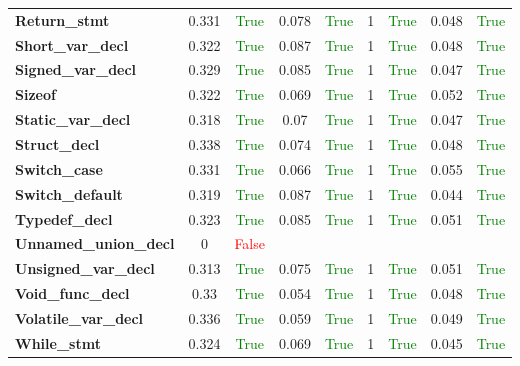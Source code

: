\documentclass{article}
\begin{document}
\begin{xltabular}{\textwidth}{lcccccccc}
\textbf{{\fontsize{10}{12}\selectfont Return\_stmt}}& 0.331&\textcolor{green}{True}& 0.078&\textcolor{green}{True}& 1&\textcolor{green}{True}& 0.048&\textcolor{green}{True} \\[0.5ex]
\textbf{{\fontsize{10}{12}\selectfont Short\_var\_decl}}& 0.322&\textcolor{green}{True}& 0.087&\textcolor{green}{True}& 1&\textcolor{green}{True}& 0.048&\textcolor{green}{True} \\[0.5ex]
\textbf{{\fontsize{10}{12}\selectfont Signed\_var\_decl}}& 0.329&\textcolor{green}{True}& 0.085&\textcolor{green}{True}& 1&\textcolor{green}{True}& 0.047&\textcolor{green}{True} \\[0.5ex]
\textbf{{\fontsize{10}{12}\selectfont Sizeof}}& 0.322&\textcolor{green}{True}& 0.069&\textcolor{green}{True}& 1&\textcolor{green}{True}& 0.052&\textcolor{green}{True} \\[0.5ex]
\textbf{{\fontsize{10}{12}\selectfont Static\_var\_decl}}& 0.318&\textcolor{green}{True}& 0.07&\textcolor{green}{True}& 1&\textcolor{green}{True}& 0.047&\textcolor{green}{True} \\[0.5ex]
\textbf{{\fontsize{10}{12}\selectfont Struct\_decl}}& 0.338&\textcolor{green}{True}& 0.074&\textcolor{green}{True}& 1&\textcolor{green}{True}& 0.048&\textcolor{green}{True} \\[0.5ex]
\textbf{{\fontsize{10}{12}\selectfont Switch\_case}}& 0.331&\textcolor{green}{True}& 0.066&\textcolor{green}{True}& 1&\textcolor{green}{True}& 0.055&\textcolor{green}{True} \\[0.5ex]
\textbf{{\fontsize{10}{12}\selectfont Switch\_default}}& 0.319&\textcolor{green}{True}& 0.087&\textcolor{green}{True}& 1&\textcolor{green}{True}& 0.044&\textcolor{green}{True} \\[0.5ex]
\textbf{{\fontsize{10}{12}\selectfont Typedef\_decl}}& 0.323&\textcolor{green}{True}& 0.085&\textcolor{green}{True}& 1&\textcolor{green}{True}& 0.051&\textcolor{green}{True} \\[0.5ex]
\textbf{{\fontsize{10}{12}\selectfont Unnamed\_union\_decl}}& 0&\textcolor{red}{False} \\[0.5ex]
\textbf{{\fontsize{10}{12}\selectfont Unsigned\_var\_decl}}& 0.313&\textcolor{green}{True}& 0.075&\textcolor{green}{True}& 1&\textcolor{green}{True}& 0.051&\textcolor{green}{True} \\[0.5ex]
\textbf{{\fontsize{10}{12}\selectfont Void\_func\_decl}}& 0.33&\textcolor{green}{True}& 0.054&\textcolor{green}{True}& 1&\textcolor{green}{True}& 0.048&\textcolor{green}{True} \\[0.5ex]
\textbf{{\fontsize{10}{12}\selectfont Volatile\_var\_decl}}& 0.336&\textcolor{green}{True}& 0.059&\textcolor{green}{True}& 1&\textcolor{green}{True}& 0.049&\textcolor{green}{True} \\[0.5ex]
\textbf{{\fontsize{10}{12}\selectfont While\_stmt}}& 0.324&\textcolor{green}{True}& 0.069&\textcolor{green}{True}& 1&\textcolor{green}{True}& 0.045&\textcolor{green}{True} \\[0.5ex]
\bottomrule
\end{xltabular}
\newpage
\end{document}
